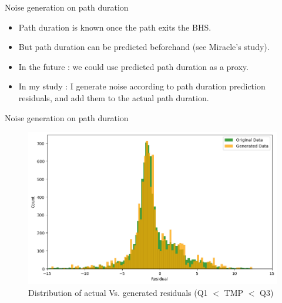 \documentclass{beamer}
\begin{document}
\begin{frame}{Noise generation on path duration}

\begin{itemize}
    \item Path duration is known once the path exits the BHS.
    \item But path duration can be predicted beforehand (see Miracle's study).
    \item In the future : we could use predicted path duration as a proxy. 
    \item In my study : I generate noise according to path duration prediction residuals, and add them to the actual path duration.
\end{itemize}


\end{frame}





\begin{frame}{Noise generation on path duration} 
\begin{figure}[ht]
  \centering
    \includegraphics[width=\linewidth]{Q1_Q3 distribution actual Vs. generated.png}
    \caption{Distribution of actual Vs. generated residuals (Q1 $<$ TMP $<$ Q3)}
    \label{fig:Q1_Q3 distribution actual Vs. generated}
\end{figure}
\end{frame}
\end{document}
